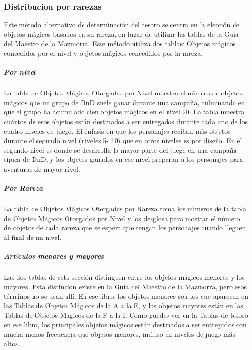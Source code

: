 \documentclass[a4paper,twocolumn,openany,10pt]{dndbook}
\begin{document}
\subsubsection*{Distribucion por rarezas}
Este método alternativo de determinación del tesoro se centra en la elección de objetos mágicos basados en su rareza, en lugar
de utilizar las tablas de la Guía del Maestro de la Mazmorra. Este método utiliza dos tablas: Objetos mágicos concedidos por el
nivel y objetos mágicos concedidos por la rareza.

\subparagraph{Por nivel} La tabla de Objetos Mágicos Otorgados por Nivel muestra el número de objetos mágicos que un grupo de
DnD suele ganar durante una campaña, culminando en que el grupo ha acumulado cien objetos mágicos en el nivel 20. La tabla
muestra cuántos de esos objetos están destinados a ser entregados durante cada uno de los cuatro niveles de juego. El énfasis en
que los personajes reciban más objetos durante el segundo nivel (niveles 5- 10) que en otros niveles es por diseño. En el
segundo nivel es donde se desarrolla la mayor parte del juego en una campaña típica de DnD, y los objetos ganados en ese nivel
preparan a los personajes para aventuras de mayor nivel.

\subparagraph{Por Rareza} La tabla de Objetos Mágicos Otorgados por Rareza toma los números de la tabla de Objetos Mágicos
Otorgados por Nivel y los desglosa para mostrar el número de objetos de cada rareza que se espera que tengan los personajes
cuando lleguen al final de un nivel.

\subparagraph{Artículos menores y mayores} Las dos tablas de esta sección distinguen entre los objetos mágicos menores y los
mayores. Esta distinción existe en la Guía del Maestro de la Mazmorra, pero esos términos no se usan allí. En ese libro, los
objetos menores son los que aparecen en las Tablas de Objetos Mágicos de la A a la E, y los objetos mayores están en las Tablas
de Objetos Mágicos de la F a la I. Como puedes ver en la Tablas de tesoro en ese libro, los principales objetos mágicos están
destinados a ser entregados con mucha menos frecuencia que objetos menores, incluso en niveles de juego más altos. 
\end{document}
